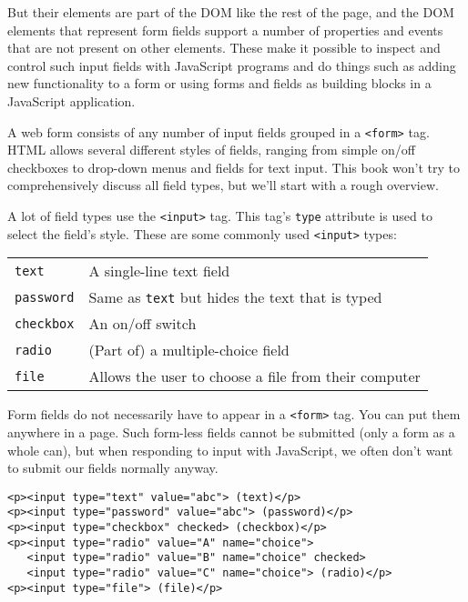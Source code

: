 But their elements are part of the DOM like the rest of the page, and the DOM elements that represent form fields support a number of properties and events that are not present on other elements. These make it possible to inspect and control such input fields with JavaScript programs and do things such as adding new functionality to a form or using forms and fields as building blocks in a JavaScript application.

A web form consists of any number of input fields grouped in a \lstinline`<form>` tag. HTML allows several different styles of fields, ranging from simple on\slash off checkboxes to drop-down menus and fields for text input. This book won't try to comprehensively discuss all field types, but we'll start with a rough overview.

A lot of field types use the \lstinline`<input>` tag. This tag's \lstinline`type` attribute is used to select the field's style. These are some commonly used \lstinline`<input>` types:

\noindent\begin{tabular}{ll}
\lstinline`text` &
A single-line \index{text field}text field
\tabularnewline
\lstinline`password` &
Same as \lstinline`text` but hides the text that is typed
\tabularnewline
\lstinline`checkbox` &
An on\slash off switch
\tabularnewline
\lstinline`radio` &
(Part of) a \index{multiple-choice}multiple-choice field
\tabularnewline
\lstinline`file` &
Allows the user to choose a file from their computer
\tabularnewline
\end{tabular}

Form fields do not necessarily have to appear in a \lstinline`<form>` tag. You can put them anywhere in a page. Such form-less fields cannot be submitted (only a form as a whole can), but when responding to input with JavaScript, we often don't want to submit our fields normally anyway.

\begin{lstlisting}
<p><input type="text" value="abc"> (text)</p>
<p><input type="password" value="abc"> (password)</p>
<p><input type="checkbox" checked> (checkbox)</p>
<p><input type="radio" value="A" name="choice">
   <input type="radio" value="B" name="choice" checked>
   <input type="radio" value="C" name="choice"> (radio)</p>
<p><input type="file"> (file)</p>
\end{lstlisting}
\noindent

